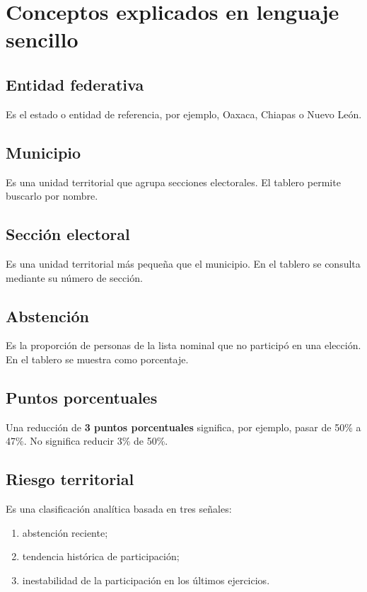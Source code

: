 \documentclass[11pt,a4paper]{article}
\begin{document}
\section{Conceptos explicados en lenguaje sencillo}

\subsection{Entidad federativa}

Es el estado o entidad de referencia, por ejemplo, Oaxaca, Chiapas o Nuevo León.

\subsection{Municipio}

Es una unidad territorial que agrupa secciones electorales. El tablero permite buscarlo por nombre.

\subsection{Sección electoral}

Es una unidad territorial más pequeña que el municipio. En el tablero se consulta mediante su número de sección.

\subsection{Abstención}

Es la proporción de personas de la lista nominal que no participó en una elección. En el tablero se muestra como porcentaje.

\subsection{Puntos porcentuales}

Una reducción de \textbf{3 puntos porcentuales} significa, por ejemplo, pasar de 50\% a 47\%. No significa reducir 3\% de 50\%.

\subsection{Riesgo territorial}

Es una clasificación analítica basada en tres señales:

\begin{enumerate}
    \item abstención reciente;
    \item tendencia histórica de participación;
    \item inestabilidad de la participación en los últimos ejercicios.
\end{enumerate}
\end{document}
